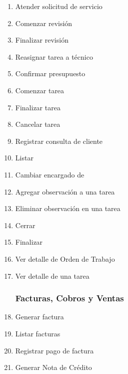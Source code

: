 \documentclass[12pt]{extarticle}
\begin{document}
\begin{spacing}{1.2}
\begin{multicols}{2}
\begin{enumerate}


			\item Atender solicitud de servicio            
            \item Comenzar revisión
            \item Finalizar revisión
            \item Reasignar tarea a técnico
            \item Confirmar presupuesto
            \item Comenzar tarea 
            \item Finalizar tarea
            \item Cancelar tarea
            \item Registrar consulta de cliente
            \item Listar \OTs{}
            \item Cambiar encargado de \OT{}
            \item Agregar observación a una tarea
            \item Eliminar observación en una tarea
            \item Cerrar \OT{}
            \item Finalizar \OT{}
            \item Ver detalle de Orden de Trabajo
            \item Ver detalle de una tarea
        \subsubsection*{Facturas, Cobros y Ventas}
            \item Generar factura 
            \item Listar facturas
            \item Registrar pago de factura
            \item Generar Nota de Crédito

\end{enumerate}
\end{multicols}
\end{spacing}
\end{document}

